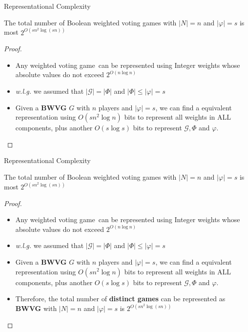 \documentclass{beamer}
\begin{document}
\begin{frame}[fragile]{Representational Complexity}
  \begin{prop1}
    The total number of Boolean weighted voting games with $|N| = n$ and $|\varphi| = s$ is
    most $2^{O(sn^2 \log(sn))}$
  \end{prop1}
  \begin{proof}
    \begin{itemize}
      \item Any weighted voting game\footnotemark\ can be represented using Integer weights whose absolute values do not exceed $2^{O(n \log{n})}$
      \item \textit{w.l.g.} we assumed that $|\mathcal{G}| = |\Phi|$ and $|\Phi| \leq |\varphi| = s$
      \item Given a \textbf{BWVG} $G$ with $n$ players and $|\varphi| = s$, we can find a equivalent representation using $O(sn^2 \log{n})$
      bits to represent all weights in ALL components, plus another $O(s \log{s})$ bits to represent $\mathcal{G}, \Phi$ and $\varphi$.
    \end{itemize}
  \end{proof}
\end{frame}

\begin{frame}[fragile]{Representational Complexity}
  \begin{prop1}
    The total number of Boolean weighted voting games with $|N| = n$ and $|\varphi| = s$ is
    most $2^{O(sn^2 \log(sn))}$
  \end{prop1}
  \begin{proof}
    \begin{itemize}
      \item Any weighted voting game\footnotemark\ can be represented using Integer weights whose absolute values do not exceed $2^{O(n \log{n})}$
      \item \textit{w.l.g.} we assumed that $|\mathcal{G}| = |\Phi|$ and $|\Phi| \leq |\varphi| = s$
      \item Given a \textbf{BWVG} $G$ with $n$ players and $|\varphi| = s$, we can find a equivalent representation using $O(sn^2 \log{n})$
      bits to represent all weights in ALL components, plus another $O(s \log{s})$ bits to represent $\mathcal{G}, \Phi$ and $\varphi$.
      \item Therefore, the total number of \textbf{distinct games} can be represented as \textbf{BWVG} with $|N| = n$ and $|\varphi| = s$ is
      $2^{O(sn^2 \log(sn))}$
    \end{itemize}
  \end{proof}
\end{frame}
\end{document}

